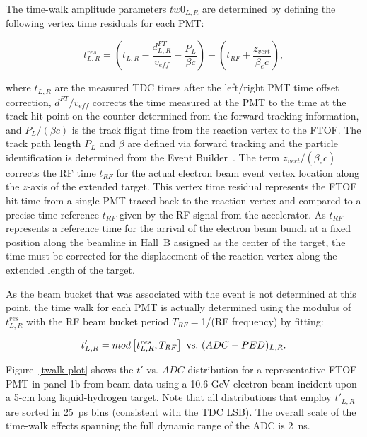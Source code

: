 \documentclass[3p,times,twocolumn]{elsarticle}
\begin{document}
The time-walk amplitude parameters $tw0_{L,R}$ are determined by defining the following vertex time
residuals for each PMT:

\begin{equation}
\label{tres}
t_{L,R}^{res} = \left(t_{L,R} - \frac{d_{L,R}^{FT}}{v_{eff}} - \frac{P_L}{\beta c} \right) 
- \left( t_{RF} + \frac{z_{vert}}{\beta_e c} \right),
\end{equation}

\noindent
where $t_{L,R}$ are the measured TDC times after the left/right PMT time offset correction, $d^{FT}/v_{eff}$
corrects the time measured at the PMT to the time at the track hit point on the counter determined from the
forward tracking information, and $P_L/(\beta c)$ is the track flight time from the reaction vertex to the
FTOF. The track path length $P_L$ and $\beta$ are defined via forward tracking and the particle identification
is determined from the Event Builder~\cite{daq-nim}. The term $z_{vert}/(\beta_e c)$ corrects the RF time
$t_{RF}$ for the actual electron beam event vertex location along the $z$-axis of the extended target. This
vertex time residual represents the FTOF hit time from a single PMT traced back to the reaction vertex and
compared to a precise time reference $t_{RF}$ given by the RF signal from the accelerator. As $t_{RF}$
represents a reference time for the arrival of the electron beam bunch at a fixed position along the beamline in
Hall~B assigned as the center of the target, the time must be corrected for the displacement of the reaction
vertex along the extended length of the target.

As the beam bucket that was associated with the event is not determined at this point, the time walk for each
PMT is actually determined using the modulus of $t^{res}_{L,R}$ with the RF beam bucket period
$T_{RF}=$1/(RF frequency) by fitting:

\begin{equation}
t'_{L,R} = mod \left[t^{res}_{L,R}, T_{RF}\right]~{\rm vs.}~(ADC-PED)_{L,R}.
\end{equation}

Figure~\ref{twalk-plot} shows the $t'$ vs. $ADC$ distribution for a representative FTOF PMT in
panel-1b from beam data using a 10.6-GeV electron beam incident upon a 5-cm long liquid-hydrogen
target. Note that all distributions that employ $t'_{L,R}$ are sorted in 25~ps bins (consistent with
the TDC LSB). The overall scale of the time-walk effects spanning the full dynamic range of the
ADC is 2~ns.
\end{document}
